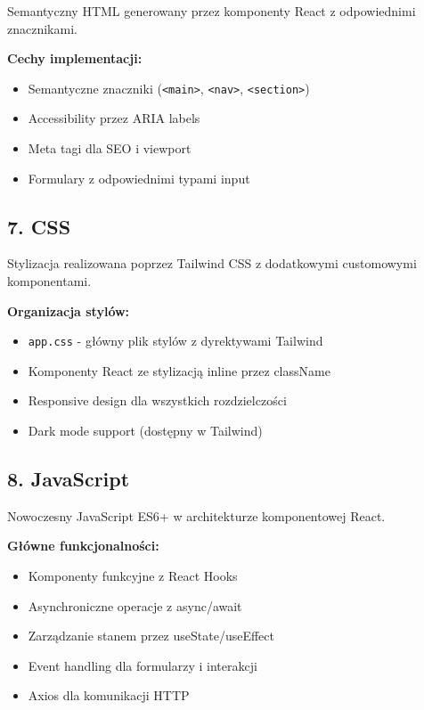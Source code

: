 \documentclass[12pt,a4paper]{article}
\begin{document}
    Semantyczny HTML generowany przez komponenty React z odpowiednimi znacznikami.

    \textbf{Cechy implementacji:}
    \begin{itemize}
        \item Semantyczne znaczniki (\texttt{<main>}, \texttt{<nav>}, \texttt{<section>})
        \item Accessibility przez ARIA labels
        \item Meta tagi dla SEO i viewport
        \item Formulary z odpowiednimi typami input
    \end{itemize}

    \subsection{7. CSS}

    Stylizacja realizowana poprzez Tailwind CSS z dodatkowymi customowymi komponentami.

    \textbf{Organizacja stylów:}
    \begin{itemize}
        \item \texttt{app.css} - główny plik stylów z dyrektywami Tailwind
        \item Komponenty React ze stylizacją inline przez className
        \item Responsive design dla wszystkich rozdzielczości
        \item Dark mode support (dostępny w Tailwind)
    \end{itemize}

    \subsection{8. JavaScript}

    Nowoczesny JavaScript ES6+ w architekturze komponentowej React.

    \textbf{Główne funkcjonalności:}
    \begin{itemize}
        \item Komponenty funkcyjne z React Hooks
        \item Asynchroniczne operacje z async/await
        \item Zarządzanie stanem przez useState/useEffect
        \item Event handling dla formularzy i interakcji
        \item Axios dla komunikacji HTTP
    \end{itemize}
\end{document}
